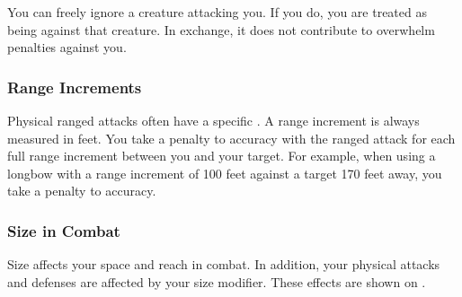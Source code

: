              You can freely ignore a creature attacking you.
            If you do, you are treated as being \unaware against that creature.
            In exchange, it does not contribute to overwhelm penalties against you.

        \subsubsection{Range Increments}\label{Range Increments}
            Physical ranged attacks often have a specific .
            A range increment is always measured in feet.
            You take a  penalty to accuracy with the ranged attack for each full range increment between you and your target.
            For example, when using a longbow with a range increment of 100 feet against a target 170 feet away, you take a  penalty to accuracy.

        \subsubsection{Size in Combat}\label{Size in Combat}
            Size affects your space and reach in combat.
            In addition, your physical attacks and defenses are affected by your size modifier.
            These effects are shown on .

